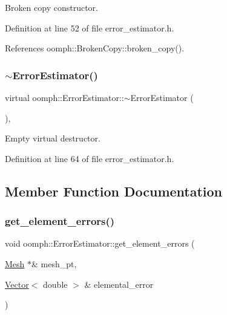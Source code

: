 Broken copy constructor. 



Definition at line 52 of file error\+\_\+estimator.\+h.



References oomph\+::\+Broken\+Copy\+::broken\+\_\+copy().

\mbox{\label{classoomph_1_1ErrorEstimator_a57ddd866184d95a75f024353ca936b5b}} 
\subsubsection{\texorpdfstring{$\sim$\+Error\+Estimator()}{~ErrorEstimator()}}
{\footnotesize\ttfamily virtual oomph\+::\+Error\+Estimator\+::$\sim$\+Error\+Estimator (\begin{DoxyParamCaption}{ }\end{DoxyParamCaption})\hspace{0.3cm}{\ttfamily [inline]}, {\ttfamily [virtual]}}



Empty virtual destructor. 



Definition at line 64 of file error\+\_\+estimator.\+h.



\subsection{Member Function Documentation}
\mbox{\label{classoomph_1_1ErrorEstimator_a3b12c5d2579360a08b6b6298cea8b142}} 
\subsubsection{\texorpdfstring{get\+\_\+element\+\_\+errors()}{get\_element\_errors()}\hspace{0.1cm}{\footnotesize\ttfamily [1/2]}}
{\footnotesize\ttfamily void oomph\+::\+Error\+Estimator\+::get\+\_\+element\+\_\+errors (\begin{DoxyParamCaption}\item[{\hyperlink{classoomph_1_1Mesh}{Mesh} $\ast$\&}]{mesh\+\_\+pt,  }\item[{\hyperlink{classoomph_1_1Vector}{Vector}$<$ double $>$ \&}]{elemental\+\_\+error }\end{DoxyParamCaption})\hspace{0.3cm}{\ttfamily [inline]}}



